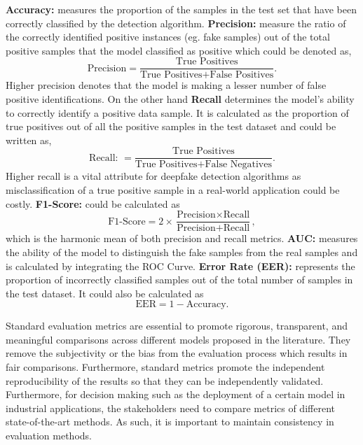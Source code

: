 \textbf{Accuracy:} measures the proportion of the samples in the test set that have been correctly classified by the detection algorithm.  \textbf{Precision: } measure the ratio of the correctly identified positive instances (eg. fake samples) out of the total positive samples that the model classified as positive which could be denoted as, \[\text{Precision} = \frac{\text{True Positives}}{\text{True Positives} + \text{False Positives}}.\] Higher precision denotes that the model is making a lesser number of false positive identifications. On the other hand \textbf{Recall} determines the model's ability to correctly identify a positive data sample. It is calculated as the proportion of true positives out of all the positive samples in the test dataset and could be written as, \[\text{Recall: } = \frac{\text{True Positives}}{\text{True Positives} + \text{False Negatives}}.\] Higher recall is a vital attribute for deepfake detection algorithms as misclassification of a true positive sample in a real-world application could be costly. \textbf{F1-Score: } could be calculated as \[\text{F1-Score} = 2 \times \frac{\text{Precision} \times \text{Recall}}{\text{Precision} + \text{Recall}},\] which is the harmonic mean of both precision and recall metrics.  \textbf{AUC: } measures the ability of the model to distinguish the fake samples from the real samples and is calculated by integrating the ROC Curve. \textbf{Error Rate (EER):} represents the proportion of incorrectly classified samples out of the total number of samples in the test dataset. It could also be calculated as \[\text{EER} = 1 - \text{Accuracy}.\]

Standard evaluation metrics are essential to promote rigorous, transparent, and meaningful comparisons across different models proposed in the literature. They remove the subjectivity or the bias from the evaluation process which results in fair comparisons. Furthermore, standard metrics promote the independent reproducibility of the results so that they can be independently validated. Furthermore, for decision making such as the deployment of a certain model in industrial applications, the stakeholders need to compare metrics of different state-of-the-art methods. As such, it is important to maintain consistency in evaluation methods. 




